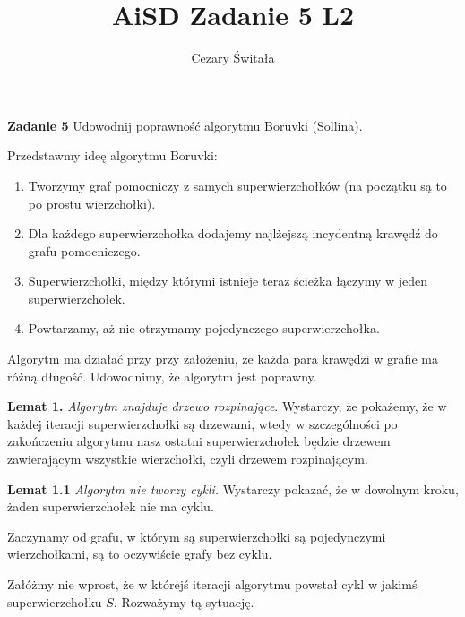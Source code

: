 \documentclass[12pt,a4paper]{article}
\title{AiSD Zadanie 5 L2}
\author{Cezary Świtała}
\begin{document}
\noindent
\textbf{Zadanie 5} Udowodnij poprawność algorytmu Boruvki (Sollina).

Przedstawmy ideę algorytmu Boruvki:

\begin{enumerate}
	\item Tworzymy graf pomocniczy z samych superwierzchołków (na początku są to po prostu wierzchołki).
	\item Dla każdego superwierzchołka dodajemy najlżejszą incydentną krawędź do grafu pomocniczego.
	\item Superwierzchołki, między którymi istnieje teraz ścieżka łączymy w jeden superwierzchołek.
	\item Powtarzamy, aż nie otrzymamy pojedynczego superwierzchołka.
\end{enumerate}
Algorytm ma działać przy przy założeniu, że każda para krawędzi w grafie ma różną długość.
\vskip 0.5cm
\noindent
Udowodnimy, że algorytm jest poprawny.

\noindent
\textbf{Lemat 1.} \emph{Algorytm znajduje drzewo rozpinające}. Wystarczy, że pokażemy, że w każdej iteracji superwierzchołki są drzewami, wtedy w szczególności po zakończeniu algorytmu nasz ostatni superwierzchołek będzie drzewem zawierającym wszystkie wierzchołki, czyli drzewem rozpinającym.

\vskip 0.5cm
\noindent
\textbf{Lemat 1.1} \emph{Algorytm nie tworzy cykli.} Wystarczy pokazać, że w dowolnym kroku, żaden superwierzchołek nie ma cyklu.

Zaczynamy od grafu, w którym są superwierzchołki są pojedynczymi wierzchołkami, są to oczywiście grafy bez cyklu.

Załóżmy nie wprost, że w którejś iteracji algorytmu powstał cykl w jakimś superwierzchołku \(S\). Rozważymy tą sytuację.
\end{document}
